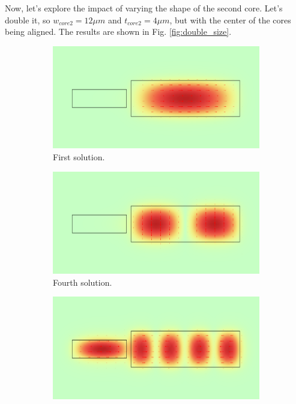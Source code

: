 \documentclass[a4paper,12pt]{article}
\begin{document}
Now, let's explore the impact of varying the shape of the 
second core. Let's double it, so $w_{core2} = 12\mu m$ and $t_{core2} = 4 \mu m$, but with the center of the cores being aligned. The results are shown in Fig. \ref{fig:double_size}.

\begin{figure}[H]
    \centering
    \begin{subfigure}{0.45\textwidth}
        \centering
        \includegraphics[scale=0.32]{SiO2_SiO2_d0.5um_w12um_t4um_normE_0.png}
        \caption{First solution.}
    \end{subfigure}
    \hfill
    \begin{subfigure}{0.45\textwidth}
        \centering
        \includegraphics[scale=0.32]{SiO2_SiO2_d0.5um_w12um_t4um_normE_3.png}
        \caption{Fourth solution.}
    \end{subfigure}
    \hfill
    \begin{subfigure}{0.45\textwidth}
        \centering
        \includegraphics[scale=0.32]{SiO2_SiO2_d0.5um_w12um_t4um_normE_6.png}

\end{subfigure}
\end{figure}
\end{document}
